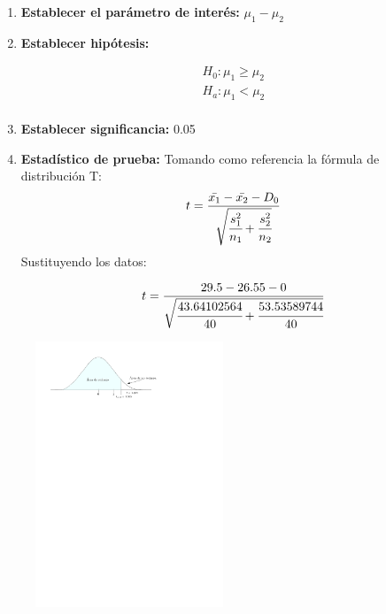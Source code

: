 \documentclass[a4paper]{report}
\begin{document}
\begin{enumerate}
    \item \textbf{Establecer el parámetro de interés:} $\mu_1-\mu_2$ 
    \item \textbf{Establecer hipótesis:}
        \begin{center}
           \begin{align*}
               H_0: \mu_1 \geq \mu_2 \\ 
               H_a: \mu_1 < \mu_2 \\
           \end{align*}
        \end{center}
    
    \item \textbf{Establecer significancia:} 0.05
    \item \textbf{Estadístico de prueba:}
        Tomando como referencia la fórmula de distribución T: 
        \[
          t = \frac{
              \bar{x_1}-\bar{x_2}-D_0
            }{
                \sqrt{
                    \cfrac{s_1^2}{n_1} + \cfrac{s_2^2}{n_2}
                }
            }
        \] Sustituyendo los datos: 
        \begin{center}
           \begin{align*}
                t = \frac{
                    29.5-26.55-0
                }{
                    \sqrt{
                        \cfrac{43.64102564}{40} + \cfrac{53.53589744}{40}
                    }
                }
           \end{align*}
        \end{center}
\end{enumerate}

\begin{figure}[H]
    \centering
    \includegraphics[width=0.5\textwidth]{first_attempt}
\end{figure}


\end{document}
